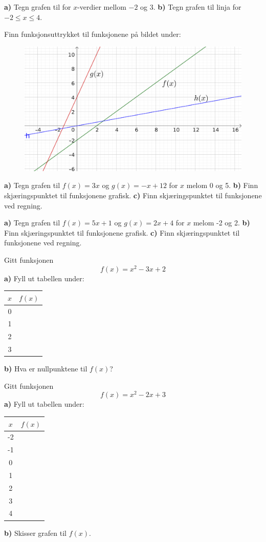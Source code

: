 \textbf{a)} Tegn grafen til  for $ x $-verdier mellom $ -2 $ og 3.\os
\textbf{b)} Tegn grafen til linja  for $ {-2\leq x\leq 4 }$.

Finn funksjonsuttrykket til funksjonene på bildet under:
\begin{figure}
	\centering
	\includegraphics[]{aogb}
\end{figure}

\textbf{a)} Tegn grafen til $ {f(x)=3x} $ og $ {g(x)=-x+12} $ for $ x $ melom 0 og 5. \os
\textbf{b)} Finn skjæringspunktet til funksjonene grafisk.\os
\textbf{c)} Finn skjæringspunktet til funksjonene ved regning.

\textbf{a)} Tegn grafen til $ {f(x)=5x+1} $ og $ {g(x)=2x+4} $ for $ x $ melom -2 og 2. \os
\textbf{b)} Finn skjæringspunktet til funksjonene grafisk.\os
\textbf{c)} Finn skjæringspunktet til funksjonene ved regning.
\nes

Gitt funksjonen
\[ f(x)=x^2-3x+2 \]
\textbf{a)} Fyll ut tabellen under:\os
\begin{center}
	\begin{tabular}{c|c}
		\hline
		$ x $ & $ f(x) $ \\ \hline
		0 &  \\ \hline
		1 &  \\ \hline
		2 &  \\ \hline	
		3 &  \\ \hline	
	\end{tabular}
\end{center}
\textbf{b)} Hva er nullpunktene til $ f(x) $?

Gitt funksjonen
\[ f(x)=x^2-2x+3 \]
\textbf{a)} Fyll ut tabellen under:\os
\begin{center}
	\begin{tabular}{c|c}
		\hline
		$ x $ & $ f(x) $ \\ \hline
		-2 &  \\ \hline
		-1 &  \\ \hline							
		0 &  \\ \hline
		1 &  \\ \hline
		2 &  \\ \hline	
		3 &  \\ \hline	
		4 &  \\ \hline		
	\end{tabular}
\end{center}
\textbf{b)} Skisser grafen til $ f(x) $.

